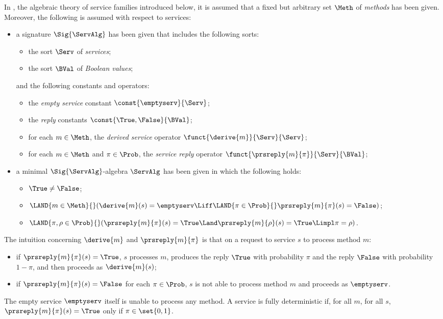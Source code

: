 \documentclass{llncs}
\begin{document}
In \SFA, the algebraic theory of service families introduced below, it 
is assumed that a fixed but arbitrary set $\Meth$ of \emph{methods} has 
been given.
Moreover, the following is assumed with respect to services:
\begin{itemize}
\item
a signature $\Sig{\ServAlg}$ has been given that includes the following
sorts:
\begin{itemize}
\item
the sort $\Serv$ of
\emph{services};
\item
the sort $\BVal$ of \emph{Boolean values};
\end{itemize}
and the following constants and operators:
\begin{itemize}
\item
the
\emph{empty service} constant $\const{\emptyserv}{\Serv}$;
\item
the \emph{reply} constants $\const{\True,\False}{\BVal}$;
\item
for each $m \in \Meth$, the
\emph{derived service} operator $\funct{\derive{m}}{\Serv}{\Serv}$;
\item
for each $m \in \Meth$ and $\pi \in \Prob$, the
\emph{service reply} operator $\funct{\prsreply{m}{\pi}}{\Serv}{\BVal}$;
\end{itemize}
\item
a minimal $\Sig{\ServAlg}$-algebra $\ServAlg$ has been given in which 
the following holds:
\begin{itemize}
\item
$\True \neq \False$; 
\item
$\LAND{m \in \Meth}{}
 (\derive{m}(s) = \emptyserv \Liff 
  \LAND{\pi \in \Prob}{} \prsreply{m}{\pi}(s) = \False)$;
\item
$\LAND{\pi,\rho \in \Prob}{} 
  (\prsreply{m}{\pi}(s) = \True \Land \prsreply{m}{\rho}(s) = \True
    \Limpl \pi = \rho)$.
\end{itemize}
\end{itemize}

The intuition concerning $\derive{m}$ and $\prsreply{m}{\pi}$ is that on 
a request to service $s$ to process method $m$:
\begin{itemize}
\item
if $\prsreply{m}{\pi}(s) = \True$, $s$ processes $m$, produces the reply
$\True$ with probability $\pi$ and the reply $\False$ with probability
$1 - \pi$, and then proceeds as $\derive{m}(s)$;
\item
if $\prsreply{m}{\pi}(s) = \False$ for each $\pi \in \Prob$, $s$ is not 
able to process method $m$ and proceeds as $\emptyserv$.
\end{itemize}
The empty service $\emptyserv$ itself is unable to process any method.
A service is fully deterministic if, for all $m$, for all $s$, 
$\prsreply{m}{\pi}(s) = \True$ only if $\pi \in \set{0,1}$.
\end{document}
